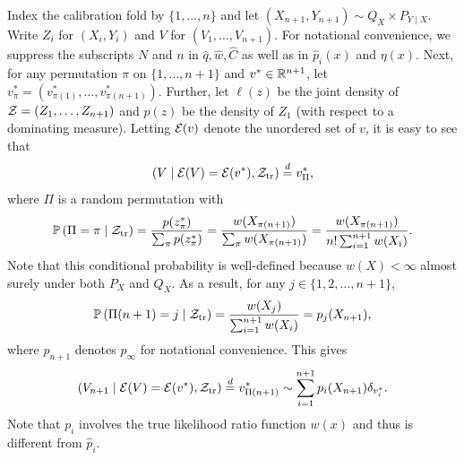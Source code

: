 Index the calibration fold by $\{1, \ldots, n\}$ and let
$(X_{n+1}, Y_{n+1})\sim Q_{X}\times P_{Y\mid X}$. Write $Z_{i}$ for
$(X_{i}, Y_{i})$ and $V$ for $(V_{1}, \ldots, V_{n + 1})$. For
notational convenience, we suppress the subscripts $N$ and $n$ in
$\hat{q}, \hat{w}, \hat{C}$ as well as in $\hat{p}_{i}(x)$ and $\eta(x)$.
Next, for any permutation $\pi$ on $\{1, \ldots, n + 1\}$ and
$v^{*}\in \mathbb{R}^{n+1}$, let
$v_{\pi}^{*} = (v_{\pi(1)}^{*}, \ldots, v_{\pi(n+1)}^{*})$. Further,
let $\ell(z)$ be the joint density of
$\mathcal{Z} = (Z_{1}, \ldots, Z_{n + 1})$ and $p(z)$ be the density of $Z_{1}$
(with respect to a dominating measure). Letting $\mathcal{E}(v)$ denote the
unordered set of $v$, it is easy to see that
\begin{equation}
  \label{eq:weighted_conformal_cond}
  \left( V \mid \mathcal{E}(V) = \mathcal{E}(v^{*}), \mathcal{Z}_{\mathrm{tr}}\right) \stackrel{d}{=} v_{\Pi}^{*},
\end{equation}
where $\Pi$ is a random permutation with
\[\mathbb{P}\left(\Pi = \pi\mid \mathcal{Z}_{\mathrm{tr}}\right) = \frac{p(z_{\pi}^{*})}{\sum_{\pi}p(z_{\pi}^{*})} = \frac{w(X_{\pi(n + 1)})}{\sum_{\pi}w(X_{\pi(n + 1)})} = \frac{w(X_{\pi(n + 1)})}{n!\sum_{i=1}^{n+1}w(X_{i})}.\]
Note that this conditional probability is well-defined because $w(X) < \infty$ almost surely under both $P_{X}$ and $Q_{X}$. As a result, for any $j\in \{1, 2, \ldots, n + 1\}$,
\[\mathbb{P}\left(\Pi(n+1) = j\mid \mathcal{Z}_{\mathrm{tr}}\right) = \frac{w(X_{j})}{\sum_{i=1}^{n+1}w(X_{i})} = p_{j}(X_{n+1}),\]
where $p_{n+1}$ denotes $p_{\infty}$ for notational convenience. This
gives 
\begin{equation}
  \label{eq:Vn+1}
  \left( V_{n+1} \mid \mathcal{E}(V) = \mathcal{E}(v^{*}), \mathcal{Z}_{\mathrm{tr}}\right) \stackrel{d}{=} v_{\Pi(n+1)}^{*}\sim \sum_{i=1}^{n+1}p_{i}(X_{n+1})\delta_{v_{i}^{*}}.
\end{equation}
Note that $p_{i}$ involves the true likelihood ratio function $w(x)$ and thus is different from $\hat{p}_{i}$.

